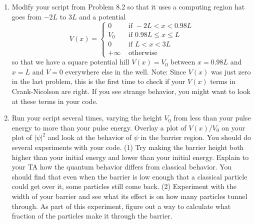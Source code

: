 \begin{problem}\label{P8.3}
\begin{enumerate}[label=(\alph*)]
	\item Modify your script from Problem 8.2 so that it uses a computing region hat goes from $-2L$ to $3L$ and a potential
\begin{equation}\label{eq:89}
V(x)= \begin{cases}0 & \text { if }-2 L<x<0.98 L \\ V_{0} & \text { if } 0.98 L \leq x \leq L \\ 0 & \text { if } L<x<3 L \\ +\infty & \text { otherwise }\end{cases}
\end{equation}
so that we have a square potential hill $V(x) = V_0$ between $x = 0.98L$ and $x = L$ and $V = 0$ everywhere else in the well.
Note: Since $V(x)$ was just zero in the last problem, this is the first time
to check if your $V(x)$ terms in Crank-Nicolson are right. If you see
strange behavior, you might want to look at these terms in your code.
\item Run your script several times, varying the height $V_0$ from less than your pulse energy to more than your pulse energy. Overlay a plot
of $V(x)/V_0$ on your plot of $ \vert \psi\vert^2$ and look at the behavior of $\psi$ in the barrier region. You should do several experiments with your code. (1) Try making
the barrier height both higher than your initial energy and lower than
your initial energy. Explain to your TA how the quantum behavior
differs from classical behavior. You should find that even when the
barrier is low enough that a classical particle could get over it, some
particles still come back. (2) Experiment with the width of your barrier
and see what its effect is on how many particles tunnel through. As
part of this experiment, figure out a way to calculate what fraction of
the particles make it through the barrier.

\end{enumerate}
\end{problem}